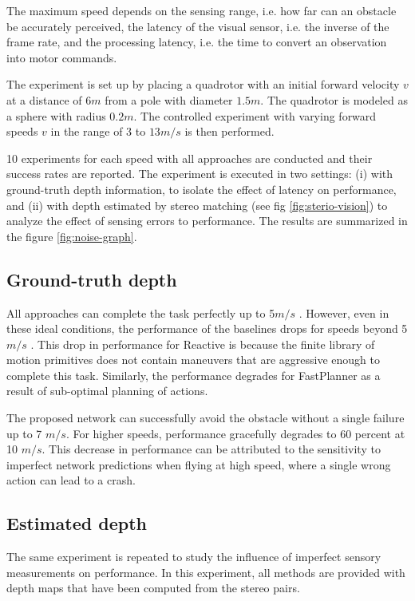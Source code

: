 The
maximum speed depends on the sensing range, i.e. how far can an
obstacle be accurately perceived, the latency of the visual sensor, i.e.
the inverse of the frame rate, and the processing latency, i.e. the time
to convert an observation into motor commands. 

The experiment is set up by placing a quadrotor with an initial
forward velocity $v$ at a distance of $6 m$ from a pole with diameter $1.5 m$.
The quadrotor is modeled as a sphere with radius $0.2 m$. The controlled experiment with varying
forward speeds $v$ in the range of 3 to $13 m/s$ is then performed.

10 experiments for each speed with all approaches are conducted and their success rates are reported. The experiment is executed in two settings: (i) with ground-truth depth information, to isolate the effect of latency on performance, and (ii) with depth estimated by stereo matching \cite{stereoMatching} (see fig \ref{fig:sterio-vision}) to analyze the effect of sensing errors to performance.
The results are summarized in the figure \ref{fig:noise-graph}.

\subsection{Ground-truth depth}

All approaches can complete the
task perfectly up to 5$m/s$ . However, even in these ideal conditions,
the performance of the baselines drops for speeds beyond 5$m/s$ . This
drop in performance for Reactive \cite{reactive_method} is because the
finite library of motion primitives does not contain maneuvers that are aggressive enough to complete this task. Similarly, the performance
degrades for FastPlanner \cite{fastPlanner} as a result of sub-optimal planning of actions.

The proposed network can successfully avoid the obstacle without a
single failure up to 7 $m/s$. For higher speeds, performance gracefully degrades to 60 percent at 10 $m/s$. This decrease in performance can
be attributed to the sensitivity to imperfect network predictions when
flying at high speed, where a single wrong action can lead to a crash.

\subsection{Estimated depth}
The same experiment is repeated to study the influence of imperfect sensory measurements on performance. In this experiment, all methods are provided with depth maps that have been computed from the stereo pairs.  

